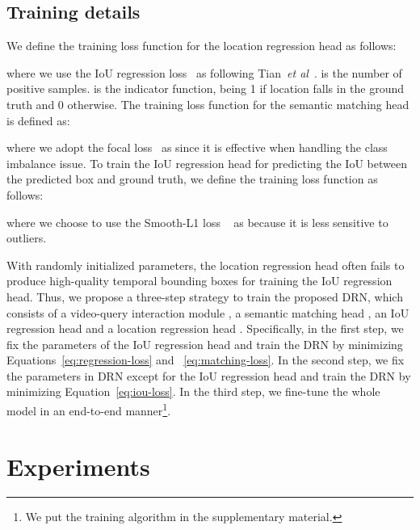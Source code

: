 \documentclass[10pt,twocolumn,letterpaper]{article}
\def\etal{\emph{et al}\onedot}
\begin{document}
	

	


	

	
	


	
	\subsection{Training details}
	\label{sec:training}
	
	We define the training loss function for the location regression head as follows:
	
	where we use the IoU regression loss~\cite{yu2016unitbox} as   following Tian~\etal~\cite{tian2019fcos}.  is the number of positive samples.  is the indicator function, being 1 if location  falls in the ground truth and 0 otherwise.
	The training loss function for the semantic matching head is defined as:
	
	where we adopt the focal loss~\cite{lin2017focal} as  since it is effective when handling the class imbalance issue. 
	To train the IoU regression head for predicting the IoU between the predicted box and ground truth, we define the training loss function as follows:
	
	where we choose to use the Smooth-L1 loss ~\cite{girshick2015fast} as  because it is less sensitive to outliers.
	


With randomly initialized parameters, the location regression head often fails to produce high-quality temporal bounding boxes for training the IoU regression head. Thus, we propose a three-step strategy to train the proposed DRN, which consists of a video-query interaction module , a semantic matching head , an IoU regression head  and a location regression head .
	Specifically, in the first step, we fix the parameters of the IoU regression head and train the DRN by minimizing Equations~\eqref{eq:regression-loss} and ~\eqref{eq:matching-loss}. In the second step, we fix the parameters in DRN except for the IoU regression head and train the DRN by minimizing Equation~\eqref{eq:iou-loss}. 
In the third step, we fine-tune the whole model in an end-to-end manner\footnote{We put the training algorithm in the supplementary material.}.


			
	

	
	\section{Experiments}
\end{document}
